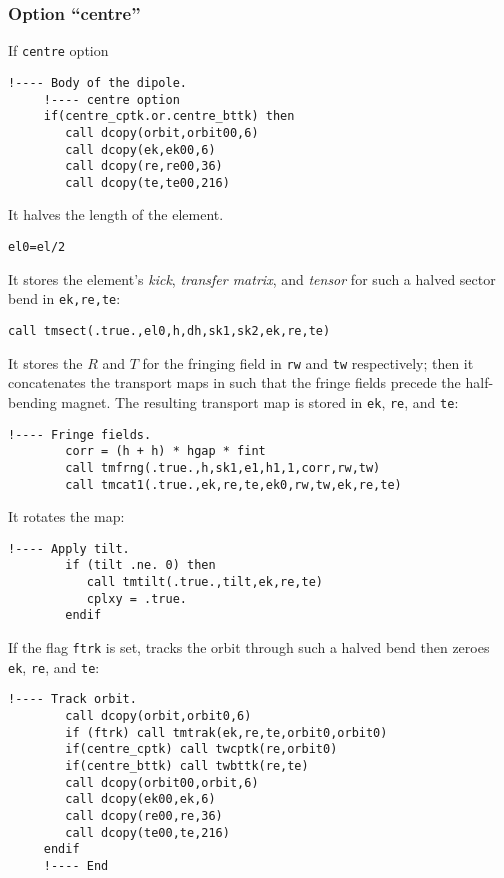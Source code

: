 \documentclass{cern-art} %
\renewcommand{\L}[1]{\lstinline[firstnumber=last]{#1}}
\begin{document}
\subsubsection{Option ``centre''}
If \L{centre} option
   \begin{lstlisting}[firstnumber=last]
     !---- Body of the dipole.
     !---- centre option
     if(centre_cptk.or.centre_bttk) then
        call dcopy(orbit,orbit00,6)
        call dcopy(ek,ek00,6)
        call dcopy(re,re00,36)
        call dcopy(te,te00,216)
  \end{lstlisting}
It halves the length of the element.
   \begin{lstlisting}[firstnumber=last]
        el0=el/2
\end{lstlisting}
It stores the element's \textit{kick}, \textit{transfer matrix}, and \textit{tensor} for such a halved sector bend in \L{ek,re,te}:
\begin{lstlisting}[firstnumber=last]
        call tmsect(.true.,el0,h,dh,sk1,sk2,ek,re,te)
\end{lstlisting}
It stores the $R$ and $T$ for the fringing field in \L{rw} and \L{tw} respectively; then it concatenates the transport maps in such that the fringe fields precede the half-bending magnet. The resulting transport map is stored in   \L{ek},  \L{re}, and \L{te}:
\begin{lstlisting}[firstnumber=last]
        !---- Fringe fields.
        corr = (h + h) * hgap * fint
        call tmfrng(.true.,h,sk1,e1,h1,1,corr,rw,tw)
        call tmcat1(.true.,ek,re,te,ek0,rw,tw,ek,re,te)
\end{lstlisting}
It rotates the map:
\begin{lstlisting}[firstnumber=last]
        !---- Apply tilt.
        if (tilt .ne. 0) then
           call tmtilt(.true.,tilt,ek,re,te)
           cplxy = .true.
        endif
\end{lstlisting}
If the flag \L{ftrk} is set, tracks the orbit through such a halved bend then zeroes \L{ek},  \L{re}, and \L{te}:
\begin{lstlisting}[firstnumber=last]
        !---- Track orbit.
        call dcopy(orbit,orbit0,6)
        if (ftrk) call tmtrak(ek,re,te,orbit0,orbit0)
        if(centre_cptk) call twcptk(re,orbit0)
        if(centre_bttk) call twbttk(re,te)
        call dcopy(orbit00,orbit,6)
        call dcopy(ek00,ek,6)
        call dcopy(re00,re,36)
        call dcopy(te00,te,216)
     endif
     !---- End
  \end{lstlisting}
\end{document}
